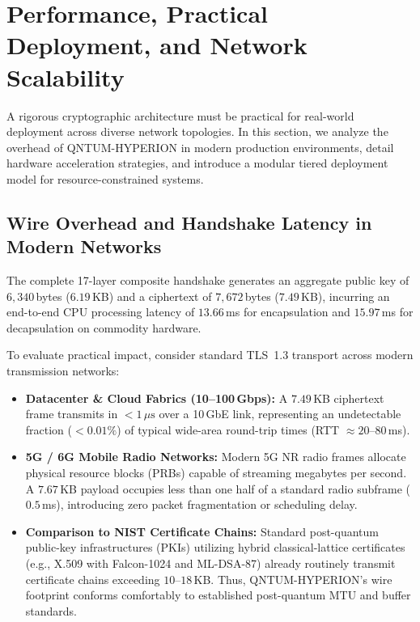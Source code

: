 \documentclass{ieeeaccess}
\begin{document}
\section{Performance, Practical Deployment, and Network Scalability}
\label{sec:deployment}

A rigorous cryptographic architecture must be practical for real-world deployment across diverse network topologies. In this section, we analyze the overhead of \textsc{QNTUM-HYPERION} in modern production environments, detail hardware acceleration strategies, and introduce a modular tiered deployment model for resource-constrained systems.

\subsection{Wire Overhead and Handshake Latency in Modern Networks}
The complete 17-layer composite handshake generates an aggregate public key of $6{,}340$\,bytes ($6.19$\,KB) and a ciphertext of $7{,}672$\,bytes ($7.49$\,KB), incurring an end-to-end CPU processing latency of $13.66$\,ms for encapsulation and $15.97$\,ms for decapsulation on commodity hardware. 

To evaluate practical impact, consider standard TLS~1.3 transport across modern transmission networks:
\begin{itemize}
  \item \textbf{Datacenter \& Cloud Fabrics (10--100\,Gbps):} A $7.49$\,KB ciphertext frame transmits in $<1\,\mu\text{s}$ over a 10\,GbE link, representing an undetectable fraction ($<0.01\%$) of typical wide-area round-trip times (RTT $\approx 20\text{--}80$\,ms).
  \item \textbf{5G / 6G Mobile Radio Networks:} Modern 5G NR radio frames allocate physical resource blocks (PRBs) capable of streaming megabytes per second. A $7.67$\,KB payload occupies less than one half of a standard radio subframe ($0.5$\,ms), introducing zero packet fragmentation or scheduling delay.
  \item \textbf{Comparison to NIST Certificate Chains:} Standard post-quantum public-key infrastructures (PKIs) utilizing hybrid classical-lattice certificates (e.g., X.509 with Falcon-1024 and ML-DSA-87) already routinely transmit certificate chains exceeding $10\text{--}18$\,KB. Thus, \textsc{QNTUM-HYPERION}'s wire footprint conforms comfortably to established post-quantum MTU and buffer standards.
\end{itemize}
\end{document}
